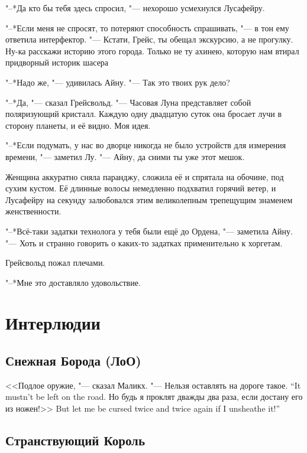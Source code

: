 "--*Да кто бы тебя здесь спросил, "--- нехорошо усмехнулся Лусафейру.

"--*Если меня не спросят, то потеряют способность спрашивать, "--- в тон ему ответила интерфектор.
"--- Кстати, Грейс, ты обещал экскурсию, а не прогулку.
Ну-ка расскажи историю этого города.
Только не ту ахинею, которую нам втирал придворный историк шасера\footnotemark\ldotst
{}

\spacing

"--*Надо же, "--- удивилась Айну.
"--- Так это твоих рук дело?

"--*Да, "--- сказал Грейсвольд.
"--- Часовая Луна представляет собой поляризующий кристалл.
Каждую одну двадцатую суток она бросает лучи в сторону планеты, и её видно.
Моя идея.

"--*Если подумать, у нас во дворце никогда не было устройств для измерения времени, "--- заметил Лу.
"--- Айну, да сними ты уже этот мешок.

Женщина аккуратно сняла паранджу, сложила её и спрятала на обочине, под сухим кустом.
Её длинные волосы немедленно подхватил горячий ветер, и Лусафейру на секунду залюбовался этим великолепным трепещущим знаменем женственности.

"--*Всё-таки задатки технолога у тебя были ещё до Ордена, "--- заметила Айну.
"--- Хоть и странно говорить о каких-то задатках применительно к хоргетам.

Грейсвольд пожал плечами.

"--*Мне это доставляло удовольствие.

\chapter{Интерлюдии}

\section{Снежная Борода (ЛоО)}

<<Подлое оружие, "--- сказал Маликх.
{"--- Нельзя оставлять на дороге такое.}
{``It mustn't be left on the road.}
{Но будь я проклят дважды два раза, если достану его из ножен!>>}
{But let me be cursed twice and twice again if I unsheathe it!''}

\section{Странствующий Король}

